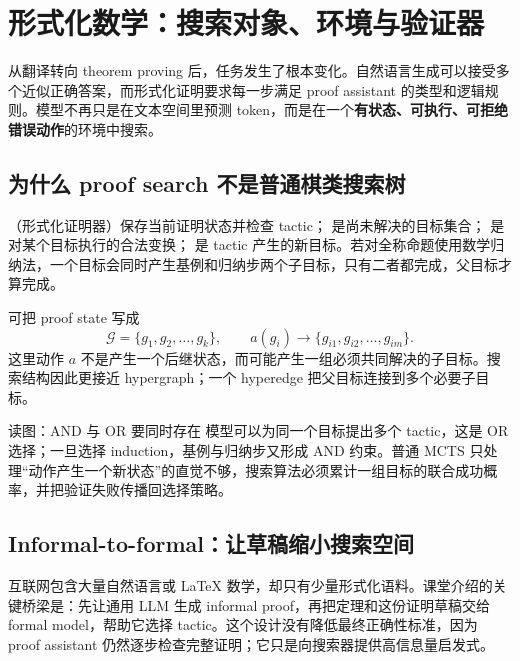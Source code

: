 \section{形式化数学：搜索对象、环境与验证器}

从翻译转向 theorem proving 后，任务发生了根本变化。自然语言生成可以接受多个近似正确答案，而形式化证明要求每一步满足 proof assistant 的类型和逻辑规则。模型不再只是在文本空间里预测 token，而是在一个\textbf{有状态、可执行、可拒绝错误动作}的环境中搜索。

\subsection{为什么 proof search 不是普通棋类搜索树}

（形式化证明器）保存当前证明状态并检查 tactic； 是尚未解决的目标集合； 是对某个目标执行的合法变换； 是 tactic 产生的新目标。若对全称命题使用数学归纳法，一个目标会同时产生基例和归纳步两个子目标，只有二者都完成，父目标才算完成。

可把 proof state 写成
\[
\mathcal{G}=\{g_1,g_2,\ldots,g_k\},
\qquad
a(g_i)\rightarrow\{g_{i1},g_{i2},\ldots,g_{im}\}.
\]
这里动作 $a$ 不是产生一个后继状态，而可能产生一组必须共同解决的子目标。搜索结构因此更接近 hypergraph；一个 hyperedge 把父目标连接到多个必要子目标。


\begin{knowledgebox}{读图：AND 与 OR 要同时存在}
模型可以为同一个目标提出多个 tactic，这是 OR 选择；一旦选择 induction，基例与归纳步又形成 AND 约束。普通 MCTS 只处理“动作产生一个新状态”的直觉不够，搜索算法必须累计一组目标的联合成功概率，并把验证失败传播回选择策略。
\end{knowledgebox}

\subsection{Informal-to-formal：让草稿缩小搜索空间}

互联网包含大量自然语言或 \LaTeX{} 数学，却只有少量形式化语料。课堂介绍的关键桥梁是：先让通用 LLM 生成 informal proof，再把定理和这份证明草稿交给 formal model，帮助它选择 tactic。这个设计没有降低最终正确性标准，因为 proof assistant 仍然逐步检查完整证明；它只是向搜索器提供高信息量启发式。

